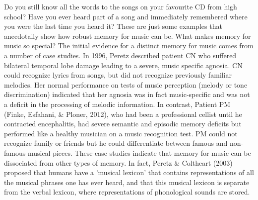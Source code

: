 \documentclass[12pt,letterpaper]{report}
\begin{document}
Do you still know all the words to the songs on your favourite CD from high school? Have you ever heard part of a song and immediately remembered where you were the last time you heard it? These are just some examples that anecdotally show how robust memory for music can be.
What makes memory for music so special? 
The initial evidence for a distinct memory for music comes from a number of case studies. In 1996, Peretz described patient CN who suffered bilateral temporal lobe damage leading to a severe, music specific agnosia. CN could recognize lyrics from songs, but did not recognize previously familiar melodies. Her normal performance on tests of music perception (melody or tone discrimination) indicated that her agnosia was in fact music-specific and was not a deficit in the processing of melodic information. In contrast, Patient PM (Finke, Esfahani, \& Ploner, 2012), who had been a professional cellist until he contracted encephalitis, had severe semantic and episodic memory deficits but performed like a healthy musician on a music recognition test. PM could not recognize family or friends but he could differentiate between famous and non-famous musical pieces. These case studies indicate that memory for music can be dissociated from other types of memory. In fact, Peretz \& Coltheart (2003) proposed that humans have a 'musical lexicon' that contains representations of all the musical phrases one has ever heard, and that this musical lexicon is separate from the verbal lexicon, where representations of phonological sounds are stored. 
\end{document}
